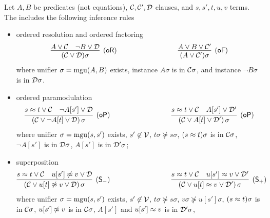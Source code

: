 
\begin{definition}\label{def:superposition-calculus}
	Let \( A,B \) be predicates (not equations),
	\( \mathcal{C},\mathcal{C}',\mathcal{D} \) clauses, and \( s,s', t,u,v \) terms.
	The  includes the following inference rules
	\begin{itemize}
		\item ordered resolution and ordered factoring
		\begin{gather*}
		\infer
		[\mathsf{(oR)}]
		{(\mcC \lor \mcD)\sigma}
		{{ A} \lor\mcC & { \lnot B} \lor\mcD}
		\hspace{3cm}
		\infer
		[\mathsf{(oF)}]
		{(A \lor \mcC')\sigma}
		{{ A}\lor B\lor\mcC'}
		\end{gather*}
		where unifier \( \sigma=\operatorname{mgu}(A,B) \) exists,
		instance \( A\sigma \) is \txtSTRICTLY{} in \( \mathcal{C} \sigma \),
		and	instance \( \lnot B\sigma \) is \txtMAXIMAL{} in \( \mathcal{D}\sigma \).
		\item ordered paramodulation
		\begin{gather*}
		\infer
		[\mathsf{(oP)}]
		{(\mcC\lor \lnot A[t]\lor\mcD)\,\sigma}
		{{ s\mEQ t} \lor\mcC\quad { \lnot A[s']}\lor\mcD}
		\hspace{3cm}
		\infer
		[\mathsf{(oP)}]
		{(\mcC\lor A[t]\lor\mcD')\,\sigma}
		{{ s\mEQ t} \lor\mcC\quad { A[s']}\lor\mcD'}
\end{gather*}
where unifier \( \sigma=\operatorname{mgu}(s,s') \) exists, 
\( s'\not\in\mathcal{V} \),
\( t\sigma\not\succcurlyeq s\sigma \),
\( (s\approx t)\sigma \) is \txtSTRICTLY{} in \( \mathcal{C}\sigma \),
\( \lnot A[s'] \) is \txtMAXIMAL{} in \( \mathcal{D}\sigma \),
\( A[s'] \) is \txtSTRICTLY{} in \( \mathcal{D}'\sigma \);
\item superposition
\begin{gather*}
		\infer
		[\mathsf{(S_-)}]
		{(\mcC\lor u[t]\mNE v\lor\mcD)\,\sigma}
		{{ s\mEQ t}\lor\mcC\quad { u[s']\mNE v}\lor\mcD}
		\hspace{3cm}
		\infer
		[\mathsf{(S_+)}]
		{(\mcC\lor u[t]\mEQ v\lor\mcD')\,\sigma}
		{{ s\mEQ t}\lor\mcC\quad { u[s']\mEQ v}\lor\mcD'}
		\end{gather*}
		where unifier \( \sigma=\operatorname{mgu}(s,s') \) exists,
		\( s'\not\in\mathcal{V} \),
		\( t\sigma\not\succcurlyeq s\sigma \),
		\( v\sigma\not\succcurlyeq u[s']\sigma \),
		\( (s\approx t)\sigma \) is \txtSTRICTLY{} in \( \mathcal{C}\sigma \),
		\( u[s']\not\approx v \) is \txtMAXIMAL{} in \( \mathcal{C}\sigma \),
		\( A[s'] \) and \( u[s']\approx v \) is \txtSTRICTLY{} in \( \mathcal{D}'\sigma \),

\end{itemize}
\end{definition}
